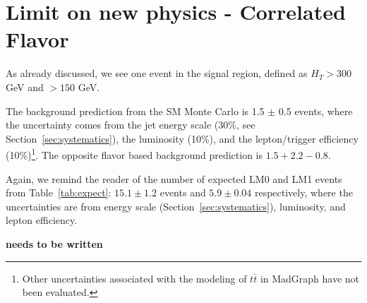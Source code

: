 \section{Limit on new physics - Correlated Flavor}
\label{sec:limit}

As already discussed, we see one event 
in the signal region, defined as $H_T>$300 GeV and 
\met$>150$ GeV.

The background prediction from the SM Monte Carlo is 
1.5 $\pm$ 0.5 events, where the uncertainty comes from 
the jet energy scale (30\%, see Section~\ref{sec:systematics}),
the luminosity (10\%), and the lepton/trigger 
efficiency (10\%)\footnote{Other uncertainties associated with 
the modeling of $t\bar{t}$ in MadGraph have not been evaluated.}.
The opposite flavor based background prediction is $1.5 + 2.2 - 0.8$.

Again, we remind the reader of the number of expected
LM0 and LM1 events from Table~\ref{tab:expect}: $15.1 \pm 1.2$ 
events and $5.9 \pm 0.04$ respectively, where the uncertainties
are from energy scale (Section~\ref{sec:systematics}), luminosity,
and lepton efficiency.

{\bf needs to be written}
